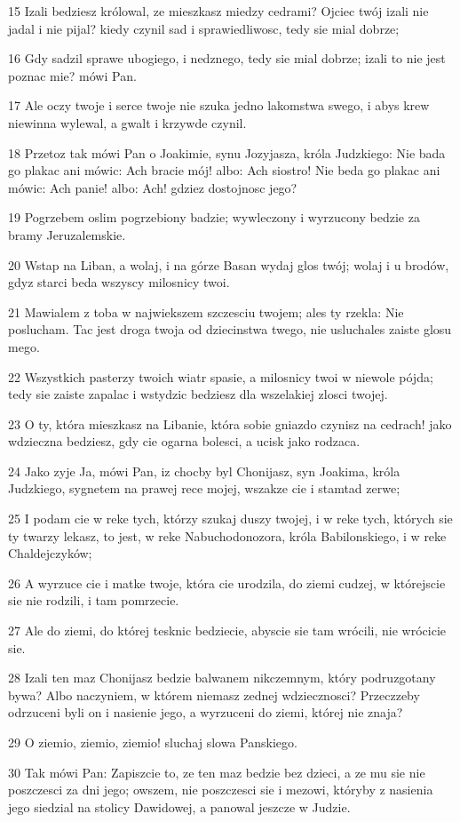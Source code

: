 \par 15 Izali bedziesz królowal, ze mieszkasz miedzy cedrami? Ojciec twój izali nie jadal i nie pijal? kiedy czynil sad i sprawiedliwosc, tedy sie mial dobrze;
\par 16 Gdy sadzil sprawe ubogiego, i nedznego, tedy sie mial dobrze; izali to nie jest poznac mie? mówi Pan.
\par 17 Ale oczy twoje i serce twoje nie szuka jedno lakomstwa swego, i abys krew niewinna wylewal, a gwalt i krzywde czynil.
\par 18 Przetoz tak mówi Pan o Joakimie, synu Jozyjasza, króla Judzkiego: Nie bada go plakac ani mówic: Ach bracie mój! albo: Ach siostro! Nie beda go plakac ani mówic: Ach panie! albo: Ach! gdziez dostojnosc jego?
\par 19 Pogrzebem oslim pogrzebiony badzie; wywleczony i wyrzucony bedzie za bramy Jeruzalemskie.
\par 20 Wstap na Liban, a wolaj, i na górze Basan wydaj glos twój; wolaj i u brodów, gdyz starci beda wszyscy milosnicy twoi.
\par 21 Mawialem z toba w najwiekszem szczesciu twojem; ales ty rzekla: Nie poslucham. Tac jest droga twoja od dziecinstwa twego, nie usluchales zaiste glosu mego.
\par 22 Wszystkich pasterzy twoich wiatr spasie, a milosnicy twoi w niewole pójda; tedy sie zaiste zapalac i wstydzic bedziesz dla wszelakiej zlosci twojej.
\par 23 O ty, która mieszkasz na Libanie, która sobie gniazdo czynisz na cedrach! jako wdzieczna bedziesz, gdy cie ogarna bolesci, a ucisk jako rodzaca.
\par 24 Jako zyje Ja, mówi Pan, iz chocby byl Chonijasz, syn Joakima, króla Judzkiego, sygnetem na prawej rece mojej, wszakze cie i stamtad zerwe;
\par 25 I podam cie w reke tych, którzy szukaj duszy twojej, i w reke tych, których sie ty twarzy lekasz, to jest, w reke Nabuchodonozora, króla Babilonskiego, i w reke Chaldejczyków;
\par 26 A wyrzuce cie i matke twoje, która cie urodzila, do ziemi cudzej, w którejscie sie nie rodzili, i tam pomrzecie.
\par 27 Ale do ziemi, do której tesknic bedziecie, abyscie sie tam wrócili, nie wrócicie sie.
\par 28 Izali ten maz Chonijasz bedzie balwanem nikczemnym, który podruzgotany bywa? Albo naczyniem, w którem niemasz zednej wdziecznosci? Przeczzeby odrzuceni byli on i nasienie jego, a wyrzuceni do ziemi, której nie znaja?
\par 29 O ziemio, ziemio, ziemio! sluchaj slowa Panskiego.
\par 30 Tak mówi Pan: Zapiszcie to, ze ten maz bedzie bez dzieci, a ze mu sie nie poszczesci za dni jego; owszem, nie poszczesci sie i mezowi, któryby z nasienia jego siedzial na stolicy Dawidowej, a panowal jeszcze w Judzie.

